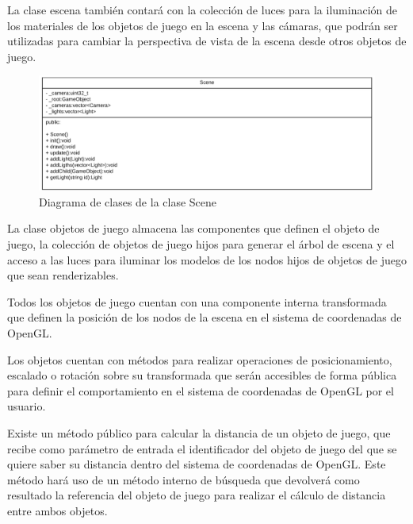 \documentclass[a4paper, 17pt]{book}
\begin{document}
\vspace{1mm} %

La clase escena también contará con la colección de luces para la iluminación de los materiales de los objetos de juego en
la escena y las cámaras, que podrán ser utilizadas para cambiar la perspectiva de vista de la escena desde otros objetos de juego.

\begin{figure}[H]
    \centering
    \includegraphics[scale=0.30, keepaspectratio]{img/Scene.png}
    \caption{Diagrama de clases de la clase Scene}
    \label{figura:Blender}
\end{figure}

La clase objetos de juego almacena las componentes que definen el objeto de juego, la colección de objetos de juego hijos para generar
el árbol de escena y el acceso a las luces para iluminar los modelos de los nodos hijos de objetos de juego que sean renderizables.

\vspace{1mm} %

Todos los objetos de juego cuentan con una componente interna transformada que definen la posición de los nodos de la escena en el
sistema de coordenadas de OpenGL. 

\vspace{1mm} %

Los objetos cuentan con métodos para realizar operaciones de posicionamiento, escalado o rotación sobre su transformada que serán
accesibles de forma pública para definir el comportamiento en el sistema de coordenadas de OpenGL por el usuario.

\vspace{1mm} %

Existe un método público para calcular la distancia de un objeto de juego, que recibe como parámetro de entrada el identificador
del objeto de juego del que se quiere saber su distancia dentro del sistema de coordenadas de OpenGL. Este método hará uso de
un método interno de búsqueda que devolverá como resultado la referencia del objeto de juego para realizar el cálculo de distancia
entre ambos objetos.
\end{document}
